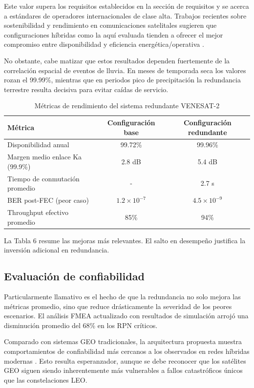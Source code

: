 Este valor supera los requisitos establecidos en la sección de requisitos y se acerca a estándares de operadores internacionales de clase alta. Trabajos recientes sobre sostenibilidad y rendimiento en comunicaciones satelitales sugieren que configuraciones híbridas como la aquí evaluada tienden a ofrecer el mejor compromiso entre disponibilidad y eficiencia energética/operativa \cite{PerformanceSatComm2022}.

No obstante, cabe matizar que estos resultados dependen fuertemente de la correlación espacial de eventos de lluvia. En meses de temporada seca los valores rozan el 99.99\%, mientras que en periodos pico de precipitación la redundancia terrestre resulta decisiva para evitar caídas de servicio.

\begin{table}[h]
\centering
\caption{Métricas de rendimiento del sistema redundante VENESAT-2}
\label{tab:metricas_rendimiento}
\begin{tabular}{lcc}
\hline
\textbf{Métrica} & \textbf{Configuración base} & \textbf{Configuración redundante} \\
\hline
Disponibilidad anual & 99.72\% & 99.96\% \\
Margen medio enlace Ka (99.9\%) & 2.8 dB & 5.4 dB \\
Tiempo de conmutación promedio & - & 2.7 s \\
BER post-FEC (peor caso) & $1.2 \times 10^{-7}$ & $4.5 \times 10^{-9}$ \\
Throughput efectivo promedio & 85\% & 94\% \\
\hline
\end{tabular}
\end{table}

La Tabla 6 resume las mejoras más relevantes. El salto en desempeño justifica la inversión adicional en redundancia.

\subsection{Evaluación de confiabilidad}

Particularmente llamativo es el hecho de que la redundancia no solo mejora las métricas promedio, sino que reduce drásticamente la severidad de los peores escenarios. El análisis FMEA actualizado con resultados de simulación arrojó una disminución promedio del 68\% en los RPN críticos.

Comparado con sistemas GEO tradicionales, la arquitectura propuesta muestra comportamientos de confiabilidad más cercanos a los observados en redes híbridas modernas \cite{LEOvsGEO2024}. Esto resulta esperanzador, aunque se debe reconocer que los satélites GEO siguen siendo inherentemente más vulnerables a fallos catastróficos únicos que las constelaciones LEO.


